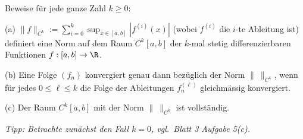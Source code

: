 \begin{prob}
Beweise f\"ur jede ganze Zahl $k\geq 0$: 

(a) $\|f\|_{C^k}:=\sum_{i=0}^k\sup_{x\in[a,b]}|f^{(i)}(x)|$
(wobei $f^{(i)}$ die $i$-te Ableitung ist) definiert eine Norm auf dem
Raum $C^k[a,b]$ der $k$-mal stetig differenzierbaren Funktionen
$f:[a,b]\to\R$.  

(b) Eine Folge $(f_n)$ konvergiert genau dann bez\"uglich der Norm
$\|\ \|_{C^k}$, wenn f\"ur jedes $0\leq \ell\leq k$ die Folge der
Ableitungen $f^{(\ell)}_n$ gleichm\"assig konvergiert.   

(c) Der Raum $C^k[a,b]$ mit der Norm $\|\ \|_{C^k}$ ist
vollst\"andig.

{\em Tipp: Betrachte zun\"achst den Fall $k=0$, vgl.~Blatt 3 Aufgabe 5(c).}
\end{prob}
